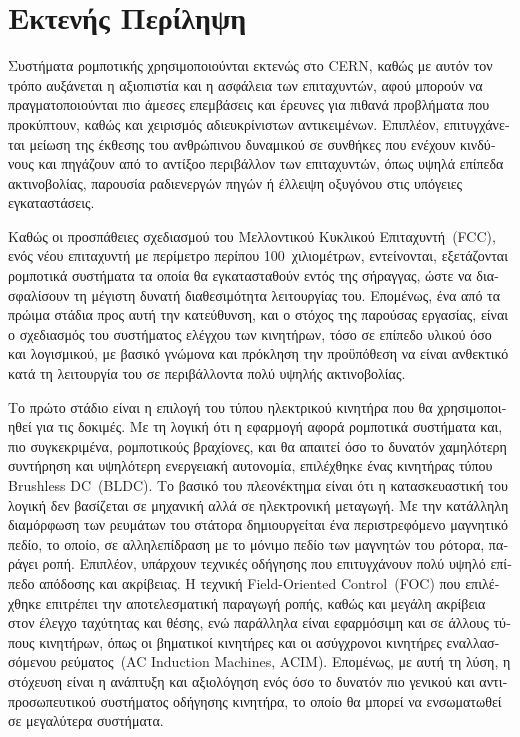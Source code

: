 \chapter*{Εκτενής Περίληψη}

\begin{greek}

Συστήματα ρομποτικής χρησιμοποιούνται εκτενώς στο CERN, καθώς με αυτόν τον τρόπο αυξάνεται η αξιοπιστία και η ασφάλεια των επιταχυντών, αφού μπορούν να πραγματοποιούνται πιο άμεσες επεμβάσεις και έρευνες για πιθανά προβλήματα που προκύπτουν, καθώς και χειρισμός αδιευκρίνιστων αντικειμένων. Επιπλέον, επιτυγχάνεται μείωση της έκθεσης του ανθρώπινου δυναμικού σε συνθήκες που ενέχουν κινδύνους και πηγάζουν από το αντίξοο περιβάλλον των επιταχυντών, όπως υψηλά επίπεδα ακτινοβολίας, παρουσία ραδιενεργών πηγών ή έλλειψη οξυγόνου στις υπόγειες εγκαταστάσεις.

Καθώς οι προσπάθειες σχεδιασμού του Μελλοντικού Κυκλικού Επιταχυντή~(FCC), ενός νέου επιταχυντή με περίμετρο περίπου 100~χιλιομέτρων, εντείνονται, εξετάζονται ρομποτικά συστήματα τα οποία θα εγκατασταθούν εντός της σήραγγας, ώστε να διασφαλίσουν τη μέγιστη δυνατή διαθεσιμότητα λειτουργίας του. Επομένως, ένα από τα πρώιμα στάδια προς αυτή την κατεύθυνση, και ο στόχος της παρούσας εργασίας, είναι ο σχεδιασμός του συστήματος ελέγχου των κινητήρων, τόσο σε επίπεδο υλικού όσο και λογισμικού, με βασικό γνώμονα και πρόκληση την προϋπόθεση να είναι ανθεκτικό κατά τη λειτουργία του σε περιβάλλοντα πολύ υψηλής ακτινοβολίας.

Το πρώτο στάδιο είναι η επιλογή του τύπου ηλεκτρικού κινητήρα που θα χρησιμοποιηθεί για τις δοκιμές. Με τη λογική ότι η εφαρμογή αφορά ρομποτικά συστήματα και, πιο συγκεκριμένα, ρομποτικούς βραχίονες, και θα απαιτεί όσο το δυνατόν χαμηλότερη συντήρηση και υψηλότερη ενεργειακή αυτονομία, επιλέχθηκε ένας κινητήρας τύπου Brushless DC~(BLDC). Το βασικό του πλεονέκτημα είναι ότι η κατασκευαστική του λογική δεν βασίζεται σε μηχανική αλλά σε ηλεκτρονική μεταγωγή. Με την κατάλληλη διαμόρφωση των ρευμάτων του στάτορα δημιουργείται ένα περιστρεφόμενο μαγνητικό πεδίο, το οποίο, σε αλληλεπίδραση με το μόνιμο πεδίο των μαγνητών του ρότορα, παράγει ροπή. Επιπλέον, υπάρχουν τεχνικές οδήγησης που επιτυγχάνουν πολύ υψηλό επίπεδο απόδοσης και ακρίβειας. Η τεχνική Field-Oriented Control~(FOC) που επιλέχθηκε επιτρέπει την αποτελεσματική παραγωγή ροπής, καθώς και μεγάλη ακρίβεια στον έλεγχο ταχύτητας και θέσης, ενώ παράλληλα είναι εφαρμόσιμη και σε άλλους τύπους κινητήρων, όπως οι βηματικοί κινητήρες και οι ασύγχρονοι κινητήρες εναλλασσόμενου ρεύματος~(AC Induction Machines, ACIM). Επομένως, με αυτή τη λύση, η στόχευση είναι η ανάπτυξη και αξιολόγηση ενός όσο το δυνατόν πιο γενικού και αντιπροσωπευτικού συστήματος οδήγησης κινητήρα, το οποίο θα μπορεί να ενσωματωθεί σε μεγαλύτερα συστήματα.


\end{greek}
